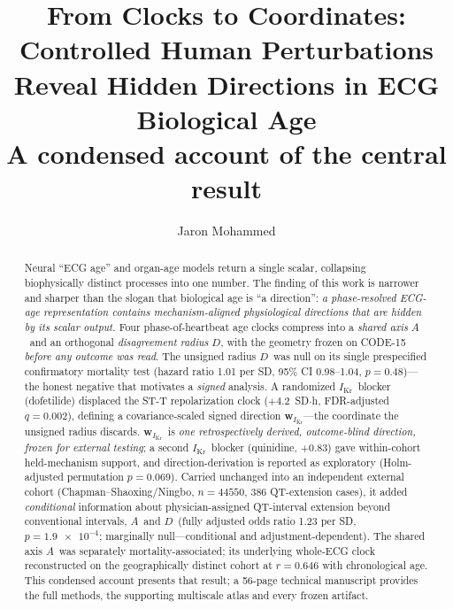 \documentclass[10pt]{article}
\title{\textbf{From Clocks to Coordinates:}\\
\textbf{Controlled Human Perturbations Reveal Hidden Directions in ECG Biological Age}\\[4pt]
\large\normalfont A condensed account of the central result}
\author{Jaron Mohammed}
\date{}
\newcommand{\D}{\ensuremath{D}}
\newcommand{\A}{\ensuremath{A}}
\newcommand{\wikr}{\ensuremath{\mathbf{w}_{I_{\text{Kr}}}}}
\newcommand{\Ikr}{\ensuremath{I_{\text{Kr}}}}
\begin{document}
\maketitle
\vspace{-2.2em}

\begin{abstract}
\noindent
Neural ``ECG age'' and organ-age models return a single scalar, collapsing biophysically
distinct processes into one number. The finding of this work is narrower and sharper than the
slogan that biological age is ``a direction'': \emph{a phase-resolved ECG-age representation
contains mechanism-aligned physiological directions that are hidden by its scalar output.} Four
phase-of-heartbeat age clocks compress into a \emph{shared axis} \A\ and an orthogonal
\emph{disagreement radius} \D, with the geometry frozen on CODE-15 \emph{before any outcome was
read}. The unsigned radius \D\ was null on its single prespecified confirmatory mortality test
(hazard ratio \num{1.01} per SD, 95\% CI \numrange{0.98}{1.04}, $p=\num{0.48}$)---the honest
negative that motivates a \emph{signed} analysis. A randomized \Ikr\ blocker (dofetilide)
displaced the ST-T repolarization clock ($+\num{4.2}$~SD$\cdot$h, FDR-adjusted
$q=\num{0.002}$), defining a covariance-scaled signed direction \wikr---the coordinate the
unsigned radius discards. \wikr\ is \emph{one retrospectively derived, outcome-blind direction,
frozen for external testing}; a second \Ikr\ blocker (quinidine, $+\num{0.83}$) gave within-cohort
held-mechanism support, and direction-derivation is reported as exploratory (Holm-adjusted
permutation $p=\num{0.069}$). Carried unchanged into an independent external cohort
(Chapman--Shaoxing/Ningbo, $n=\num{44550}$, \num{386} QT-extension cases), it added
\emph{conditional} information about physician-assigned QT-interval extension beyond conventional
intervals, \A\ and \D\ (fully adjusted odds ratio \num{1.23} per SD, $p=\num{1.9e-4}$; marginally
null---conditional and adjustment-dependent). The shared axis \A\ was separately mortality-associated; its
underlying whole-ECG clock reconstructed on the geographically distinct cohort at $r=\num{0.646}$
with chronological age. This condensed account presents that result; a \num{56}-page technical
manuscript provides the full methods, the supporting multiscale atlas and every frozen artifact.
\end{abstract}
\end{document}
